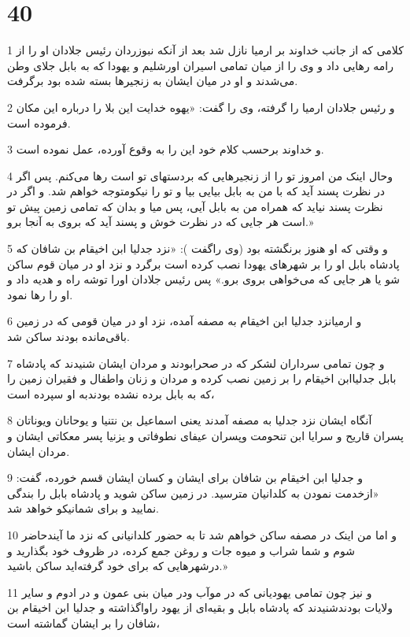 \chapter{40}

\par 1 کلامی که از جانب خداوند بر ارمیا نازل شد بعد از آنکه نبوزردان رئیس جلادان او را از رامه رهایی داد و وی را از میان تمامی اسیران اورشلیم و یهودا که به بابل جلای وطن می‌شدند و او در میان ایشان به زنجیرها بسته شده بود برگرفت.
\par 2 و رئیس جلادان ارمیا را گرفته، وی را گفت: «یهوه خدایت این بلا را درباره این مکان فرموده است.
\par 3 و خداوند برحسب کلام خود این را به وقوع آورده، عمل نموده است.
\par 4 وحال اینک من امروز تو را از زنجیرهایی که بردستهای تو است رها می‌کنم. پس اگر در نظرت پسند آید که با من به بابل بیایی بیا و تو را نیکومتوجه خواهم شد. و اگر در نظرت پسند نیاید که همراه من به بابل آیی، پس میا و بدان که تمامی زمین پیش تو است هر جایی که در نظرت خوش و پسند آید که بروی به آنجا برو.»
\par 5 و وقتی که او هنوز برنگشته بود (وی راگفت ): «نزد جدلیا ابن اخیقام بن شافان که پادشاه بابل او را بر شهرهای یهودا نصب کرده است برگرد و نزد او در میان قوم ساکن شو یا هر جایی که می‌خواهی بروی برو.» پس رئیس جلادان اورا توشه راه و هدیه داد و او را رها نمود.
\par 6 و ارمیانزد جدلیا ابن اخیقام به مصفه آمده، نزد او در میان قومی که در زمین باقی‌مانده بودند ساکن شد.
\par 7 و چون تمامی سرداران لشکر که در صحرابودند و مردان ایشان شنیدند که پادشاه بابل جدلیاابن اخیقام را بر زمین نصب کرده و مردان و زنان واطفال و فقیران زمین را که به بابل برده نشده بودندبه او سپرده است،
\par 8 آنگاه ایشان نزد جدلیا به مصفه آمدند یعنی اسماعیل بن نتنیا و یوحانان ویوناتان پسران قاریح و سرایا ابن تنحومت وپسران عیفای نطوفاتی و یزنیا پسر معکاتی ایشان و مردان ایشان.
\par 9 و جدلیا ابن اخیقام بن شافان برای ایشان و کسان ایشان قسم خورده، گفت: «ازخدمت نمودن به کلدانیان مترسید. در زمین ساکن شوید و پادشاه بابل را بندگی نمایید و برای شمانیکو خواهد شد.
\par 10 و اما من اینک در مصفه ساکن خواهم شد تا به حضور کلدانیانی که نزد ما آیندحاضر شوم و شما شراب و میوه جات و روغن جمع کرده، در ظروف خود بگذارید و درشهرهایی که برای خود گرفته‌اید ساکن باشید.»
\par 11 و نیز چون تمامی یهودیانی که در موآب ودر میان بنی عمون و در ادوم و سایر ولایات بودندشنیدند که پادشاه بابل و بقیه‌ای از یهود راواگذاشته و جدلیا ابن اخیقام بن شافان را بر ایشان گماشته است،
